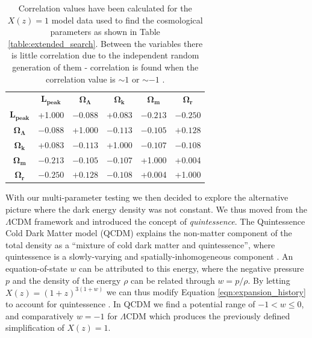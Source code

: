 \documentclass[twocolumn]{revtex4}
\begin{document}
{{{\renewcommand{\arraystretch}{1.2}%
\begin{table}[h!]
\centering
\begin{tabular}{c@{\hskip 10pt}c@{\hskip 10pt}c@{\hskip 10pt}c@{\hskip 10pt}c@{\hskip 10pt}c} 
 \hline
  & \textbf{$\boldsymbol{L_\text{peak}}$} & \textbf{$\boldsymbol{\Omega_\Lambda}$} & \textbf{$\boldsymbol{\Omega_k}$} & \textbf{$\boldsymbol{\Omega_m}$} & \textbf{$\boldsymbol{\Omega_r}$} \\ [0.5ex] 
 \textbf{$\boldsymbol{L_\text{peak}}$} & +1.000 & $-0.088$ & +0.083 & $-0.213$ & $-0.250$ \\
 \textbf{$\boldsymbol{\Omega_\Lambda}$} & $-0.088$ & +1.000 & $-0.113$ & $-0.105$ & $+0.128$ \\
 \textbf{$\boldsymbol{\Omega_k}$} & +0.083 & $-0.113$ & +1.000 & $-0.107$ & $-0.108$ \\
 \textbf{$\boldsymbol{\Omega_m}$} & $-0.213$ & $-0.105$ & $-0.107$ & +1.000 & +0.004 \\
 \textbf{$\boldsymbol{\Omega_r}$} & $-0.250$ & $+0.128$  & $-0.108$ & +0.004 & +1.000\\
 \hline
\end{tabular}
\caption{Correlation values have been calculated for the $X(z)=1$ model data used to find the cosmological parameters as shown in Table \ref{table:extended_search}. Between the variables there is little correlation due to the independent random generation of them - correlation is found when the correlation value is $\sim1$ or $\sim -1$ \cite{hugheshase}.}
\vspace{-0.5em}
\label{table:correlations}
\end{table}

With our multi-parameter testing we then decided to explore the alternative picture where the dark energy density was not constant. We thus moved from the $\Lambda$CDM framework and introduced the concept of \textit{quintessence}. The Quintessence Cold Dark Matter model (QCDM) explains the non-matter component of the total density as a ``mixture of cold dark matter and quintessence'', where quintessence is a slowly-varying and spatially-inhomogeneous component \cite{quintessence}. An equation-of-state $w$ can be attributed to this energy, where the negative pressure $p$ and the density of the energy $\rho$ can be related through $w=p /\rho$. By letting $X(z)=(1+z)^{3(1+w)}$ we can thus modify Equation \ref{eqn:expansion_history} to account for quintessence \cite{cosmo_constraints}. In QCDM we find a potential range of $-1< w \leq 0$, and comparatively $w=-1$ for $\Lambda$CDM \cite{quintessence} which produces the previously defined simplification of $X(z)=1$.

}}}
\end{document}
